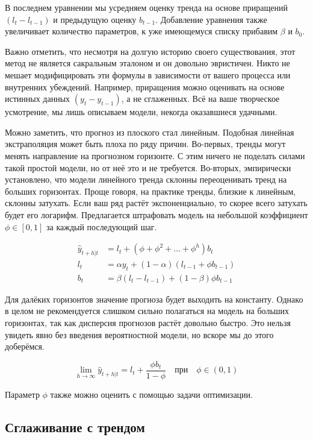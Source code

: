 \documentclass[12pt,fleqn]{article}
\begin{document}
В последнем уравнении мы усредняем оценку тренда на основе приращений $(l_t - l_{t-1})$ и предыдущую оценку $b_{t-1}$. Добавление уравнения также увеличивает количество параметров, к уже имеющемуся списку прибавим $\beta$ и $b_0$.

Важно отметить, что несмотря на долгую историю своего существования, этот метод не является сакральным эталоном и он довольно эвристичен. 
Никто не мешает модифицировать эти формулы в зависимости от вашего процесса или внутренних убеждений. 
Например, приращения можно оценивать на основе истинных данных $(y_t - y_{t-1})$, а не сглаженных. 
Всё на ваше творческое усмотрение, мы лишь описываем модели, некогда оказавшиеся удачными.

Можно заметить, что прогноз из плоского стал линейным. Подобная линейная экстраполяция может быть плоха по ряду причин. Во-первых, тренды могут менять направление на прогнозном горизонте. С этим ничего не поделать силами такой простой модели, но от неё это и не требуется. Во-вторых, эмпирически установлено, что модели линейного тренда склонны переоценивать тренд на больших горизонтах. Проще говоря, на практике тренды, близкие к линейным, склонны затухать. Если ваш ряд растёт экспоненциально, то скорее всего затухать будет его логарифм. Предлагается штрафовать модель на небольшой коэффициент $\phi \in [0, 1]$ за каждый последующий шаг.


\begin{equation}
	\begin{split}
		\hat{y}_{t+h|t } &= l_t + (\phi + \phi^2 + \ldots + \phi^h) b_t \\
		l_t &=\alpha y_t +(1-\alpha)(l_{t-1} + \phi b_{t-1}) \\
		b_t &=\beta (l_t - l_{t-1}) +(1-\beta) \phi b_{t-1}
	\end{split}
\end{equation}

Для далёких горизонтов значение прогноза будет выходить на константу. Однако в целом не рекомендуется слишком сильно полагаться на модель на больших горизонтах, так как дисперсия прогнозов растёт довольно быстро. Это нельзя увидеть явно без введения вероятностной модели, но вскоре мы до этого доберёмся.

\[ \lim\limits_{h\rightarrow\infty} 	\hat{y}_{t+h|t} =  l_t + \frac{\phi b_t}{1-\phi} \quad \text{при} \quad \phi \in (0, 1)\]

Параметр $\phi$ также можно оценить с помощью задачи оптимизации.


\subsection{Сглаживание с трендом}
\end{document}
